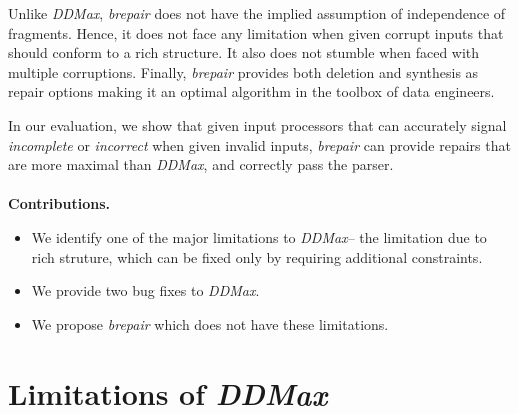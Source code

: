 \documentclass[sigconf,review,anonymous]{acmart}
\newcommand{\ddmax}{\textit{DDMax}\xspace}
\newcommand{\brepair}{\textit{brepair}\xspace}
\begin{document}
Unlike \ddmax, \brepair does not have the implied assumption of independence of
fragments. Hence, it does not face any limitation when given corrupt inputs
that should conform to a rich structure. It also does not stumble when faced
with multiple corruptions. Finally, \brepair provides both deletion and
synthesis as repair options making it an optimal algorithm in the toolbox of
data engineers.

In our evaluation, we show that given input processors that can accurately
signal \emph{incomplete} or \emph{incorrect} when given invalid inputs,
\brepair can provide repairs that are more maximal than \ddmax, and correctly
pass the parser.
\\
\\
\noindent\textbf{Contributions.}
\begin{itemize}
  \item We identify one of the major limitations to \ddmax -- the limitation due to rich struture, which can be fixed only by requiring additional constraints.
  \item We provide two bug fixes to \ddmax.
  \item We propose \brepair which does not have these limitations.
\end{itemize}

\section{Limitations of \ddmax}
\end{document}
